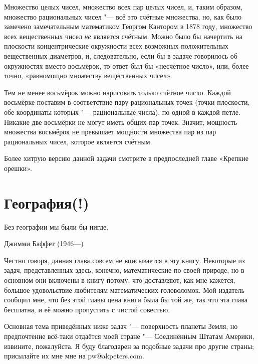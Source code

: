 \documentclass[twoside]{book}
\begin{document}
\medskip

Множество целых чисел, множество всех пар целых чисел, и, таким
образом, множество рациональных чисел "--- всё это счётные множества,
но, как было замечено замечательным
математиком
Георгом Кантором в 1878 году, множество всех вещественных чисел \emph{не} является счётным.
Можно было бы начертить на плоскости концентрические окружности всех возможных положительных вещественных диаметров, и, следовательно, если бы в задаче говорилось об окружностях вместо восьмёрок, то ответ был бы «несчётное число», или, более точно, «равномощно множеству вещественных чисел».

Тем не менее восьмёрок можно нарисовать только счётное число.
Каждой восьмёрке поставим в соответствие пару рациональных точек (точки плоскости, обе координаты которых "--- рациональные числа), по одной в каждой петле.
Никакие две восьмёрки не могут иметь общих пар точек.
Значит, мощность множества восьмёрок не превышает мощности множества пар из пар рациональных чисел, которое является счётным.\heart

\medskip

Более хитрую версию данной задачи смотрите в предпоследней главе «Крепкие орешки».



\chapter{География\upshape(!)}

\thispagestyle{empty}

\setlength{\epigraphwidth}{.4\textwidth}
\epigraph{Без географии мы были бы нигде.\vspace{1ex}}{Джимми Баффет (1946---)} 

Честно говоря, данная глава совсем не вписывается в эту книгу.
Некоторые из задач, представленных здесь, конечно, математические по своей природе, %
но в основном они включены в книгу потому, что доставляют, как мне кажется, большое удовольствие любителям математических головоломок.
Мой издатель сообщил мне, что без этой главы цена книги была бы той
же, 
так что эта глава бесплатна, и её можно пропустить с чистой совестью.

Основная тема приведённых ниже задач "--- поверхность планеты Земля,
но предпочтение всё-таки отдаётся моей стране "--- Соединённым Штатам
Америки, извините, пожалуйста.
Я буду благодарен за подобные задачи про другие страны; присылайте их мне мне на pw@akpeters.com.
\end{document}
